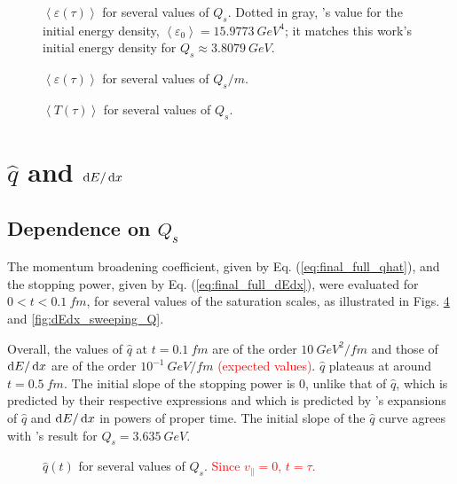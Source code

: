 \begin{figure}
\centering

\caption{$\left< \varepsilon (\tau) \right>$ for several values of $Q_s$. Dotted in gray, \cite{Carrington_2022}'s value for the initial energy density, $\left<\varepsilon_0\right> = \qty{15.9773}{GeV^4}$; it matches this work's initial energy density for $Q_s \approx \qty{3.8079}{GeV}$.}
\label{fig:energy_sweeping_Q}
\end{figure}

\begin{figure}
\centering

\caption{$\left< \varepsilon (\tau) \right>$ for several values of $Q_s/m$.}
\label{fig:energy_sweeping_Qm}
\end{figure}

\begin{figure}
\centering

\caption{$\left< T (\tau) \right>$ for several values of $Q_s$. }
\label{fig:temperature_sweeping_Q}
\end{figure}

\section{$\hat{q}$ and $\mathop{}\!\mathrm{d} E / \mathop{}\!\mathrm{d} x$}
\subsection{Dependence on $Q_s$}
The momentum broadening coefficient, given by Eq. (\ref{eq:final_full_qhat}), and the stopping power, given by Eq. (\ref{eq:final_full_dEdx}), were evaluated for $0 < t < \qty{0.1}{fm}$, for several values of the saturation scales, as illustrated in Figs. \ref{fig:qHat_sweeping_Q} and \ref{fig:dEdx_sweeping_Q}.

Overall, the values of $\hat{q}$ at $t = \qty{0.1}{fm}$ are of the order $\qty{10}{GeV^2/fm}$ and those of $\mathop{}\!\mathrm{d} E / \mathop{}\!\mathrm{d} x$ are of the order $10^{-1} \qty{}{GeV/fm}$ \textcolor{red}{(expected values)}. $\hat{q}$ plateaus at around $t = \qty{0.5}{fm}$. The initial slope of the stopping power is $0$, unlike that of $\hat{q}$, which is predicted by their respective expressions and which is predicted by \cite{Carrington_2022}'s expansions of $\hat{q}$ and $\mathop{}\!\mathrm{d} E / \mathop{}\!\mathrm{d} x$ in powers of proper time. The initial slope of the $\hat{q}$ curve  agrees with \cite{Carrington_2022}'s result for $Q_s = \qty{3.635}{GeV}$.

\begin{figure}
\centering

\caption{$\hat{q}(t)$ for several values of $Q_s$. \textcolor{red}{Since $v_\parallel=0$, $t=\tau$.} }
\label{fig:qHat_sweeping_Q}
\end{figure}

